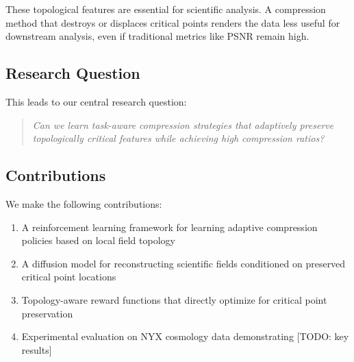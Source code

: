 These topological features are essential for scientific analysis. A compression method that destroys or displaces critical points renders the data less useful for downstream analysis, even if traditional metrics like PSNR remain high.


\subsection{Research Question}

This leads to our central research question:

\begin{quote}
\textit{Can we learn task-aware compression strategies that adaptively preserve topologically critical features while achieving high compression ratios?}
\end{quote}

\subsection{Contributions}

We make the following contributions:
\begin{enumerate}
    \item A reinforcement learning framework for learning adaptive compression policies based on local field topology
    \item A diffusion model for reconstructing scientific fields conditioned on preserved critical point locations
    \item Topology-aware reward functions that directly optimize for critical point preservation
    \item Experimental evaluation on NYX cosmology data demonstrating [TODO: key results]
\end{enumerate}
